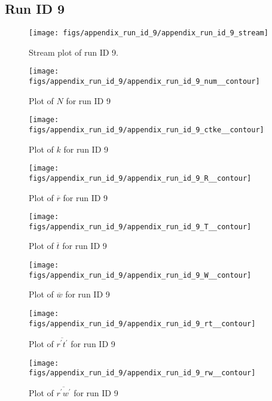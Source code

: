 \subsection{Run ID 9}
\begin{figure}[H]
\centering
\texttt{[image: figs/appendix\_run\_id\_9/appendix\_run\_id\_9\_stream]}
\caption{Stream plot of run ID 9.}
\label{fig:appendix_run_id_9_stream}
\end{figure}


\begin{figure}[H]
\centering
\texttt{[image: figs/appendix\_run\_id\_9/appendix\_run\_id\_9\_num\_\_contour]}
\caption{Plot of $N$ for run ID 9}
\label{fig:appendix_run_id_9_num__contour}
\end{figure}


\begin{figure}[H]
\centering
\texttt{[image: figs/appendix\_run\_id\_9/appendix\_run\_id\_9\_ctke\_\_contour]}
\caption{Plot of $k$ for run ID 9}
\label{fig:appendix_run_id_9_ctke__contour}
\end{figure}


\begin{figure}[H]
\centering
\texttt{[image: figs/appendix\_run\_id\_9/appendix\_run\_id\_9\_R\_\_contour]}
\caption{Plot of $\overline{r}$ for run ID 9}
\label{fig:appendix_run_id_9_R__contour}
\end{figure}


\begin{figure}[H]
\centering
\texttt{[image: figs/appendix\_run\_id\_9/appendix\_run\_id\_9\_T\_\_contour]}
\caption{Plot of $\overline{t}$ for run ID 9}
\label{fig:appendix_run_id_9_T__contour}
\end{figure}


\begin{figure}[H]
\centering
\texttt{[image: figs/appendix\_run\_id\_9/appendix\_run\_id\_9\_W\_\_contour]}
\caption{Plot of $\overline{w}$ for run ID 9}
\label{fig:appendix_run_id_9_W__contour}
\end{figure}


\begin{figure}[H]
\centering
\texttt{[image: figs/appendix\_run\_id\_9/appendix\_run\_id\_9\_rt\_\_contour]}
\caption{Plot of $\overline{r^\prime t^\prime}$ for run ID 9}
\label{fig:appendix_run_id_9_rt__contour}
\end{figure}


\begin{figure}[H]
\centering
\texttt{[image: figs/appendix\_run\_id\_9/appendix\_run\_id\_9\_rw\_\_contour]}
\caption{Plot of $\overline{r^\prime w^\prime}$ for run ID 9}
\label{fig:appendix_run_id_9_rw__contour}
\end{figure}


